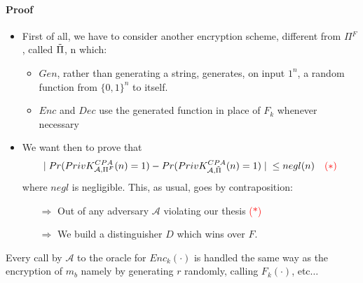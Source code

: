 \documentclass[../main]{subfiles}
\begin{document}
\paragraph{Proof}
\begin{itemize}
    \item First of all, we have to consider another encryption scheme, different from $\Pi{}^F$, called $\Tilde{\Pi{}}$, n which:
    \begin{itemize}
        \item $Gen$, rather than generating a string, generates, on input $1^n$, a random function from $\{0, 1\}^n$ to itself.
        \item $Enc$ and $Dec$ use the generated function in place of $F_k$ whenever necessary
    \end{itemize}
    \item We want then to prove that $$\mid{} Pr(PrivK^{CPA}_{\mathcal{A}, \Pi{}^F}(n)=1)-Pr(PrivK^{CPA}_{\mathcal{A}, \Tilde{\Pi{}}}(n)=1) \mid{} \leq{} negl(n) \quad{} \textcolor{red}{(*)}$$ where $negl$ is negligible.
    This, as usual, goes by contraposition:
    \begin{itemize}
        \item[$\Rightarrow{}$] Out of any adversary $\mathcal{A}$ violating our thesis \textcolor{red}{($*$)}
        \item[$\Rightarrow{}$] We build a distinguisher $D$ which wins over $F$.
    \end{itemize}
\end{itemize}
Every call by $\mathcal{A}$ to the oracle for $Enc_k(\cdot{})$ is handled the same way as the encryption of $m_b$ namely by generating $r$ randomly, calling $F_k(\cdot{})$, etc$\ldots{}$
\end{document}
